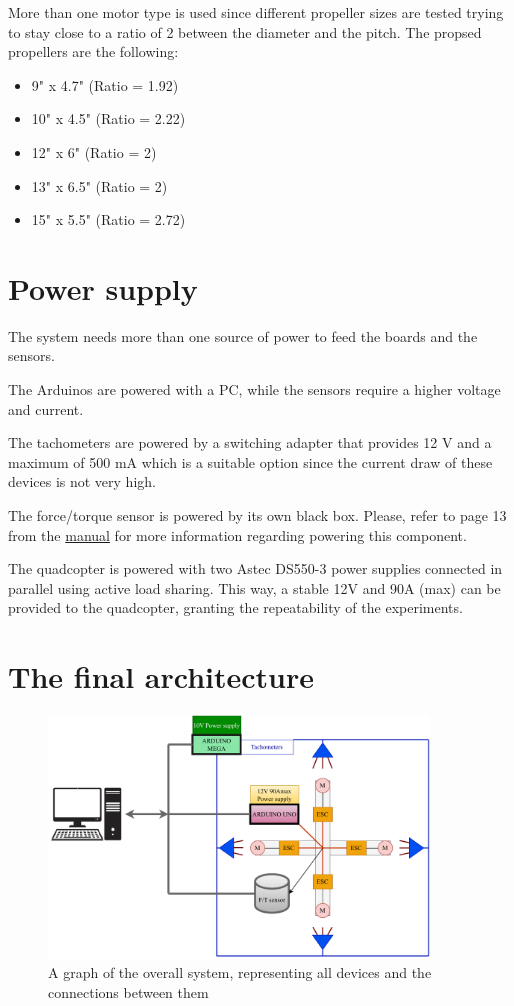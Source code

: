 \documentclass[a4paper]{article}
\begin{document}
{More than one motor type is used since different propeller sizes are tested trying to stay close to a ratio of 2 between the diameter and the pitch. The propsed propellers are the following:

\begin{itemize}
	\item 9" x 4.7" (Ratio = 1.92)
	\item 10" x 4.5" (Ratio = 2.22)
	\item 12" x 6" (Ratio = 2)
	\item 13" x 6.5" (Ratio = 2)
	\item 15" x 5.5" (Ratio = 2.72)
\end{itemize}




\section{Power supply}

The system needs more than one source of power to feed the boards and the sensors. 

The Arduinos are powered with a PC, while the sensors require a higher voltage and current.

The tachometers are powered by a switching adapter that provides 12 V and a maximum of 500 mA which is a suitable option since the current draw of these devices is not very high.

The force/torque sensor is powered by its own black box. Please, refer to page 13 from the \hyperref{https://www.ati-ia.com/app_content/documents/9620-05-DAQ.pdf}{category}{name}{manual} for more information regarding powering this component.

The quadcopter is powered with two Astec DS550-3 power supplies connected in parallel using active load sharing. This way, a stable 12V and 90A (max) can be provided to the quadcopter, granting the repeatability of the experiments.

\section{The final architecture}

\begin{figure}[h!]
	\centering
	\includegraphics[width=0.9\textwidth]{General_setup.pdf}
	\caption{A graph of the overall system, representing all devices and the connections between them}
	\label{fig:overall_system}
\end{figure}

}
\end{document}
